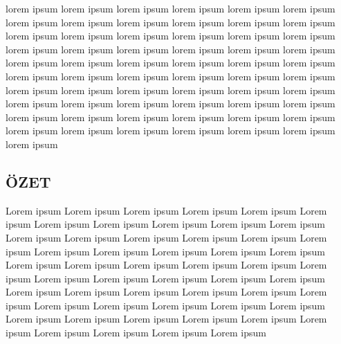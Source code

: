 \documentclass[12pt,english]{article}
\begin{document}
\begin{onehalfspace}
lorem ipsum lorem ipsum lorem ipsum lorem ipsum lorem ipsum lorem
ipsum lorem ipsum lorem ipsum lorem ipsum lorem ipsum lorem ipsum
lorem ipsum lorem ipsum lorem ipsum lorem ipsum lorem ipsum lorem
ipsum lorem ipsum lorem ipsum lorem ipsum lorem ipsum lorem ipsum
lorem ipsum lorem ipsum lorem ipsum lorem ipsum lorem ipsum lorem
ipsum lorem ipsum lorem ipsum lorem ipsum lorem ipsum lorem ipsum
lorem ipsum lorem ipsum lorem ipsum lorem ipsum lorem ipsum lorem
ipsum lorem ipsum lorem ipsum lorem ipsum lorem ipsum lorem ipsum
lorem ipsum lorem ipsum lorem ipsum lorem ipsum lorem ipsum lorem
ipsum lorem ipsum lorem ipsum lorem ipsum lorem ipsum lorem ipsum
lorem ipsum lorem ipsum lorem ipsum lorem ipsum lorem ipsum lorem
ipsum 
\end{onehalfspace}

\begin{onehalfspace}
\noindent \pagebreak
\end{onehalfspace}


\begin{onehalfspace}

\section*{\noindent ÖZET}
\end{onehalfspace}

\noindent Lorem ipsum Lorem ipsum Lorem ipsum Lorem ipsum Lorem ipsum
Lorem ipsum Lorem ipsum Lorem ipsum Lorem ipsum Lorem ipsum Lorem
ipsum Lorem ipsum Lorem ipsum Lorem ipsum Lorem ipsum Lorem ipsum
Lorem ipsum Lorem ipsum Lorem ipsum Lorem ipsum Lorem ipsum Lorem
ipsum Lorem ipsum Lorem ipsum Lorem ipsum Lorem ipsum Lorem ipsum
Lorem ipsum Lorem ipsum Lorem ipsum Lorem ipsum Lorem ipsum Lorem
ipsum Lorem ipsum Lorem ipsum Lorem ipsum Lorem ipsum Lorem ipsum
Lorem ipsum Lorem ipsum Lorem ipsum Lorem ipsum Lorem ipsum Lorem
ipsum Lorem ipsum Lorem ipsum Lorem ipsum Lorem ipsum Lorem ipsum
Lorem ipsum Lorem ipsum Lorem ipsum Lorem ipsum Lorem ipsum 

\begin{onehalfspace}
\noindent \pagebreak
\end{onehalfspace}

\begin{onehalfspace}
\thispagestyle{empty}

\pagebreak
\end{onehalfspace}
\end{document}
